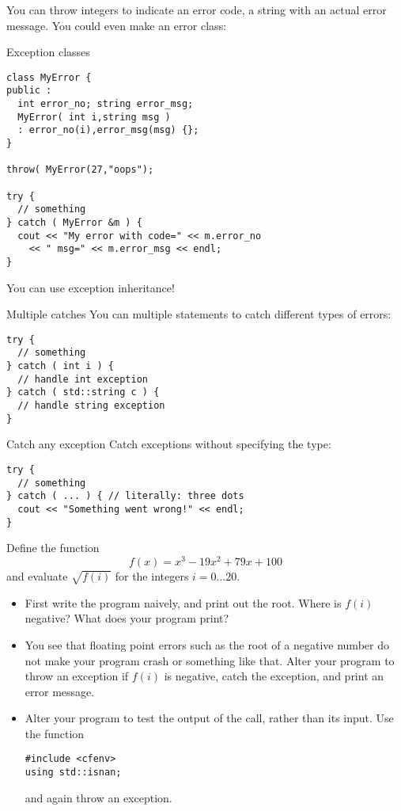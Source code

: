 You can throw integers to indicate an error code, a string with an
actual error message. You could even make an error class:

\begin{block}{Exception classes}
  \label{sl:exception-class}
\begin{lstlisting}
class MyError {
public :
  int error_no; string error_msg;
  MyError( int i,string msg )
  : error_no(i),error_msg(msg) {};
}

throw( MyError(27,"oops");

try {
  // something
} catch ( MyError &m ) {
  cout << "My error with code=" << m.error_no
    << " msg=" << m.error_msg << endl;
}
\end{lstlisting}
You can use exception inheritance!
\end{block}

\begin{block}{Multiple catches}
  \label{sl:exception-catches}
  You can multiple  statements to catch different types of
  errors:
\begin{lstlisting}
try {
  // something
} catch ( int i ) {
  // handle int exception
} catch ( std::string c ) {
  // handle string exception
}
\end{lstlisting}
\end{block}

\begin{block}{Catch any exception}
  \label{sl:exception-catchall}
  Catch exceptions without specifying the type:
\begin{lstlisting}
try {
  // something
} catch ( ... ) { // literally: three dots
  cout << "Something went wrong!" << endl;
}
\end{lstlisting}
\end{block}

\begin{exercise}
  \label{ex:throw-negroot}
  Define the function \[ f(x)=x^3-19x^2+79x+100 \] and evaluate
  $\sqrt{f(i)}$ for the integers $i=0\ldots20$.
  \begin{itemize}
  \item First write the program naively, and print out the root. Where is
    $f(i)$ negative? What does your program print?
  \item You see that floating point errors such as the root of a negative number
    do not make your program crash or
    something like that. Alter your program to throw an exception if
    $f(i)$ is negative, catch the exception, and print an error
    message.
  \item Alter your program to test the output of the  call,
    rather than its input.
    Use the function 
\begin{lstlisting}
#include <cfenv>
using std::isnan;  
\end{lstlisting}
    and again throw an exception.
  \end{itemize}
\end{exercise}

